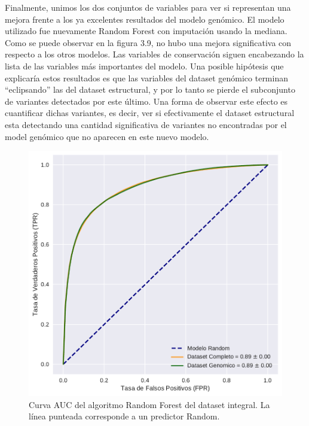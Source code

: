 Finalmente, unimos los dos conjuntos de variables para ver si representan una mejora frente a los ya excelentes resultados del modelo genómico. El modelo utilizado fue nuevamente Random Forest con imputación usando la mediana. Como se puede observar en la figura 3.9, no hubo una mejora significativa con respecto a los otros modelos. Las variables de conservación siguen encabezando la lista de las variables más importantes del modelo. Una posible hipótesis que explicaría estos resultados es que las variables del dataset genómico terminan ``eclipsando'' las del dataset estructural, y por lo tanto se pierde el subconjunto de variantes detectados por este último. Una forma de observar este efecto es cuantificar dichas variantes, es decir, ver si efectivamente el dataset estructural esta detectando una cantidad significativa de variantes no encontradas por el model genómico que no aparecen en este nuevo modelo. 

\begin{figure}[H]
    \centering
    \includegraphics[scale=0.55]{documents/latex/figures/3/auc_3.pdf}
    \caption{Curva AUC del algoritmo Random Forest del dataset integral. La línea punteada corresponde a un predictor Random.}
    \label{fig:auc_3}
\end{figure}

